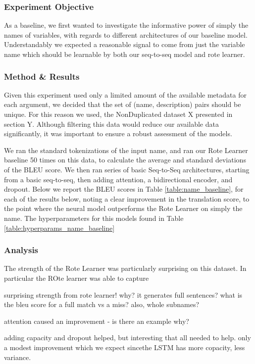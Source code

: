 \subsubsection{Experiment Objective} %

As a baseline, we first wanted to investigate the informative power of simply the names of variables, with regards to different architectures of our baseline model.
Understandably we expected a reasonable signal to come from just the variable name which should be learnable by both our seq-to-seq model and rote learner. 

\subsubsection{Method \& Results} %
Given this experiment used only a limited amount of the available metadata for each argument, we decided that the set of (name, description) pairs should be unique. 
For this reason we used, the NonDuplicated dataset X presented in section Y.
Although filtering this data would reduce our available data significantly, it was important to ensure a robust assessment of the models.

We ran the standard tokenizations of the input name, and ran our Rote Learner baseline 50 times on this data, to calculate the average and standard deviations of the BLEU score. We then ran series of basic Seq-to-Seq architectures, starting from a basic seq-to-seq, then adding attention, a bidirectional encoder, and dropout. 
Below we report the BLEU scores in Table \ref{table:name_baseline}, for each of the results below, noting a clear improvement in the translation score, to the point where the neural model outperforms the Rote Learner on simply the name.
The hyperparameters for this models found in Table \ref{table:hyperparams_name_baseline}


\subsubsection{Analysis} %

The strength of the Rote Learner was particularly surprising on this dataset. In particular the ROte learner was able to capture 

\begin{itemize*}
    \item surprising strength from rote learner! why? it generates full sentences? what is the bleu score for a full match vs a miss? also, whole subnames?
    \item attention caused an improvement - is there an example why?
    \item adding capacity and dropout helped, but interesting that all needed to help. only a modest improvement which we expect sincethe LSTM has more copacity, less variance.
\end{itemize*}



